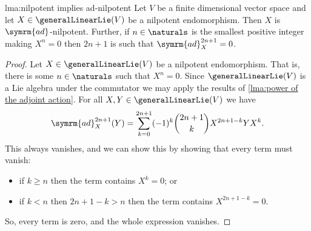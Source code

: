 \documentclass[fleqn]{NotesClass}
\newcommand{\ad}{\symrm{ad}}
\begin{document}
    \begin{lma}{}{lma:nilpotent implies ad-nilpotent}
        Let \(V\) be a finite dimensional vector space and let \(X \in \generalLinearLie(V)\) be a nilpotent endomorphism.
        Then \(X\) is \(\ad\)-nilpotent.
        Further, if \(n \in \naturals\) is the smallest positive integer making \(X^n = 0\) then \(2n + 1\) is such that \(\ad_X^{2n + 1} = 0\).
        \begin{proof}
            Let \(X \in \generalLinearLie(V)\) be a nilpotent endomorphism.
            That is, there is some \(n \in \naturals\) such that \(X^n = 0\).
            Since \(\generalLinearLie(V)\) is a Lie algebra under the commutator we may apply the results of \cref{lma:power of the adjoint action}.
            For all \(X, Y \in \generalLinearLie(V)\) we have
            \begin{equation}
                \ad_X^{2n+1}(Y) = \sum_{k=0}^{2n+1} (-1)^k \binom{2n+1}{k} X^{2n + 1 - k}YX^k.
            \end{equation}
            This always vanishes, and we can show this by showing that every term must vanish:
            \begin{itemize}
                \item if \(k \ge n\) then the term contains \(X^k = 0\); or
                \item if \(k < n\) then \(2n + 1 - k > n\) then the term contains \(X^{2n + 1 - k} = 0\).
            \end{itemize}
            So, every term is zero, and the whole expression vanishes.
        \end{proof}
    \end{lma}
    
\end{document}
